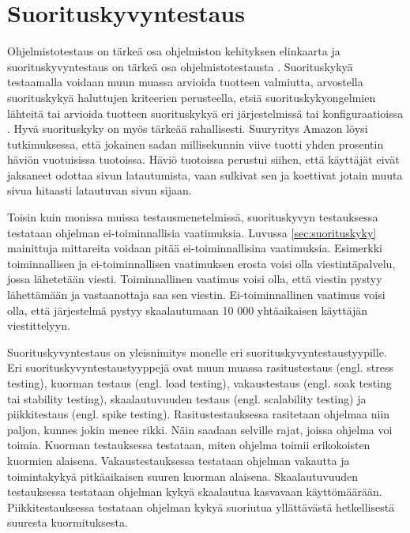 \section{Suorituskyvyntestaus}
\label{sec:suorituskyvyntestaus}
Ohjelmistotestaus on tärkeä osa ohjelmiston kehityksen elinkaarta ja suorituskyvyntestaus on tärkeä osa ohjelmistotestausta \parencite{ScrutinyOnVariousApproaches}. Suorituskykyä testaamalla voidaan muun muassa arvioida tuotteen valmiutta, arvostella suorituskykyä haluttujen kriteerien perusteella, etsiä suorituskykyongelmien lähteitä tai arvioida tuotteen suorituskykyä eri järjestelmissä tai konfiguraatioissa \parencite{PerformanceTestingGuidanceForWebApplications}. Hyvä suorituskyky on myös tärkeää rahallisesti. Suuryritys Amazon löysi tutkimuksessa, että jokainen sadan millisekunnin viive tuotti yhden prosentin häviön vuotuisissa tuotoissa. Häviö tuotoissa perustui siihen, että käyttäjät eivät jaksaneet odottaa sivun latautumista, vaan sulkivat sen ja koettivat jotain muuta sivua hitaasti latautuvan sivun sijaan. \parencite{AmazonRevenue}

Toisin kuin monissa muissa testausmenetelmissä, suorituskyvyn testauksessa testataan ohjelman ei-toiminnallisia vaatimuksia. Luvussa \ref{sec:suorituskyky} mainittuja mittareita voidaan pitää ei-toiminnallisina vaatimuksia. Esimerkki toiminnallisen ja ei-toiminnallisen vaatimuksen erosta voisi olla viestintäpalvelu, jossa lähetetään viesti. Toiminnallinen vaatimus voisi olla, että viestin pystyy lähettämään ja vastaanottaja saa sen viestin. Ei-toiminnallinen vaatimus voisi olla, että järjestelmä pystyy skaalautumaan 10 000 yhtäaikaisen käyttäjän viestittelyyn.

Suorituskyvyntestaus on yleisnimitys monelle eri suorituskyvyntestaustyypille. Eri suorituskyvyntestaustyyppejä ovat muun muassa rasitustestaus (engl. stress testing), kuorman testaus (engl. load testing), vakaustestaus (engl. soak testing tai stability testing), skaalautuvuuden testaus (engl. scalability testing) ja piikkitestaus (engl. spike testing). Rasitustestauksessa rasitetaan ohjelmaa niin paljon, kunnes jokin menee rikki. Näin saadaan selville rajat, joissa ohjelma voi toimia. Kuorman testauksessa testataan, miten ohjelma toimii erikokoisten kuormien alaisena. Vakaustestauksessa testataan ohjelman vakautta ja toimintakykyä pitkäaikaisen suuren kuorman alaisena. Skaalautuvuuden testauksessa testataan ohjelman kykyä skaalautua kasvavaan käyttömäärään. Piikkitestauksessa testataan ohjelman kykyä suoriutua yllättävästä hetkellisestä suuresta kuormituksesta. \parencite{SoftwarePerformanceTesting, WebPerformanceTestingTools}

